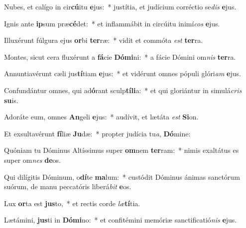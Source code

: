 \item Nubes, et calígo in cir\textbf{cú}itu \textbf{e}jus:~* justítia, et judícium corréctio se\textit{dis} \textbf{e}jus.
\item Ignis ante \textbf{ip}sum præ\textbf{cé}det:~* et inflammábit in circúitu inimí\textit{cos} \textbf{e}jus.
\item Illuxérunt fúlgura ejus \textbf{or}bi \textbf{ter}ræ:~* vidit et commóta \textit{est} \textbf{ter}ra.
\item Montes, sicut cera fluxérunt a \textbf{fá}cie \textbf{Dó}\textbf{mi}ni:~* a fácie Dómini om\textit{nis} \textbf{ter}ra.
\item Annuntiavérunt cæli jus\textbf{tí}tiam \textbf{e}jus:~* et vidérunt omnes pópuli glóri\textit{am} \textbf{e}jus.
\item Confundántur omnes, qui ad\textbf{ó}rant sculp\textbf{tí}\textbf{li}a:~* et qui gloriántur in simulá\textit{cris} \textbf{su}is.
\item Adoráte eum, omnes \textbf{An}geli \textbf{e}jus:~* audívit, et lætáta \textit{est} \textbf{Si}on.
\item Et exsultavérunt \textbf{fí}liæ \textbf{Ju}dæ:~* propter judícia tu\textit{a}, \textbf{Dó}mine:
\item Quóniam tu Dóminus Altíssimus super \textbf{om}nem \textbf{ter}ram:~* nimis exaltátus es super om\textit{nes} \textbf{de}os.
\item Qui dilígitis Dóminum, o\textbf{dí}te \textbf{ma}lum:~* custódit Dóminus ánimas sanctórum suórum, de manu peccatóris liberá\textit{bit} \textbf{e}os.
\item Lux \textbf{or}ta est \textbf{jus}to,~* et rectis corde \textit{læ}\textbf{tí}tia.
\item Lætámini, \textbf{jus}ti in \textbf{Dó}\textbf{mi}no:~* et confitémini memóriæ sanctificatió\textit{nis} \textbf{e}jus.
